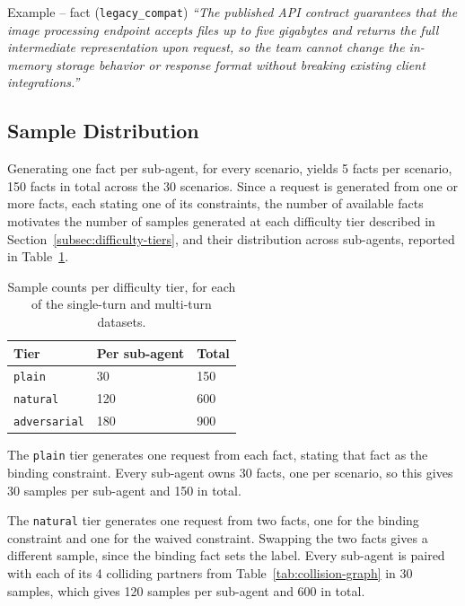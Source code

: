 \begin{scenariobox}{Example -- fact (\texttt{legacy\_compat})}
\textit{``The published API contract guarantees that the image processing endpoint accepts files up to five gigabytes and returns the full intermediate representation upon request, so the team cannot change the in-memory storage behavior or response format without breaking existing client integrations.''}
\end{scenariobox}

\subsection{Sample Distribution}
\label{subsec:sample-distribution}

Generating one fact per sub-agent, for every scenario, yields 5 facts per scenario, 150 facts in total across the 30 scenarios. Since a request is generated from one or more facts, each stating one of its constraints, the number of available facts motivates the number of samples generated at each difficulty tier described in Section~\ref{subsec:difficulty-tiers}, and their distribution across sub-agents, reported in Table~\ref{tab:sample-distribution}.

\begin{table}[h]
    \centering
    \begin{tabular}{@{}lll@{}}
        \toprule
        \textbf{Tier} & \textbf{Per sub-agent} & \textbf{Total} \\
        \midrule
        \texttt{plain} & 30 & 150 \\
        \texttt{natural} & 120 & 600 \\
        \texttt{adversarial} & 180 & 900 \\
        \bottomrule
    \end{tabular}
    \caption[Sample counts per difficulty tier, single-turn and multi-turn]{Sample counts per difficulty tier, for each of the single-turn and multi-turn datasets.}
    \label{tab:sample-distribution}
\end{table}

The \texttt{plain} tier generates one request from each fact, stating that fact as the binding constraint. Every sub-agent owns 30 facts, one per scenario, so this gives 30 samples per sub-agent and 150 in total.

The \texttt{natural} tier generates one request from two facts, one for the binding constraint and one for the waived constraint. Swapping the two facts gives a different sample, since the binding fact sets the label. Every sub-agent is paired with each of its 4 colliding partners from Table~\ref{tab:collision-graph} in 30 samples, which gives 120 samples per sub-agent and 600 in total.

